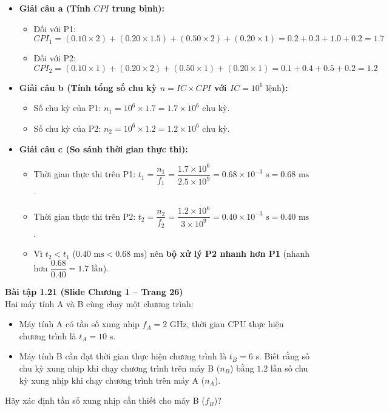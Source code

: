 \begin{itemize}
    \item \textbf{Giải câu a (Tính $CPI$ trung bình):}
    \begin{itemize}
        \item Đối với P1:
        $$CPI_1 = (0.10 \times 2) + (0.20 \times 1.5) + (0.50 \times 2) + (0.20 \times 1) = 0.2 + 0.3 + 1.0 + 0.2 = 1.7$$
        \item Đối với P2:
        $$CPI_2 = (0.10 \times 1) + (0.20 \times 2) + (0.50 \times 1) + (0.20 \times 1) = 0.1 + 0.4 + 0.5 + 0.2 = 1.2$$
    \end{itemize}
    \item \textbf{Giải câu b (Tính tổng số chu kỳ $n = IC \times CPI$ với $IC = 10^6\text{ lệnh}$):}
    \begin{itemize}
        \item Số chu kỳ của P1: $n_1 = 10^6 \times 1.7 = 1.7 \times 10^6\text{ chu kỳ}$.
        \item Số chu kỳ của P2: $n_2 = 10^6 \times 1.2 = 1.2 \times 10^6\text{ chu kỳ}$.
    \end{itemize}
    \item \textbf{Giải câu c (So sánh thời gian thực thi):}
    \begin{itemize}
        \item Thời gian thực thi trên P1: $t_1 = \dfrac{n_1}{f_1} = \dfrac{1.7 \times 10^6}{2.5 \times 10^9} = 0.68 \times 10^{-3}\text{ s} = 0.68\text{ ms}$.
        \item Thời gian thực thi trên P2: $t_2 = \dfrac{n_2}{f_2} = \dfrac{1.2 \times 10^6}{3 \times 10^9} = 0.40 \times 10^{-3}\text{ s} = 0.40\text{ ms}$.
        \item Vì $t_2 < t_1$ ($0.40\text{ ms} < 0.68\text{ ms}$) nên \textbf{bộ xử lý P2 nhanh hơn P1} (nhanh hơn $\dfrac{0.68}{0.40} = 1.7\text{ lần}$).
    \end{itemize}
\end{itemize}

\textbf{Bài tập 1.21 (Slide Chương 1 -- Trang 26)}\\
Hai máy tính A và B cùng chạy một chương trình:
\begin{itemize}
    \item Máy tính A có tần số xung nhịp $f_A = 2\text{ GHz}$, thời gian CPU thực hiện chương trình là $t_A = 10\text{ s}$.
    \item Máy tính B cần đạt thời gian thực hiện chương trình là $t_B = 6\text{ s}$. Biết rằng số chu kỳ xung nhịp khi chạy chương trình trên máy B ($n_B$) bằng $1.2\text{ lần}$ số chu kỳ xung nhịp khi chạy chương trình trên máy A ($n_A$).
\end{itemize}
Hãy xác định tần số xung nhịp cần thiết cho máy B ($f_B$)?

